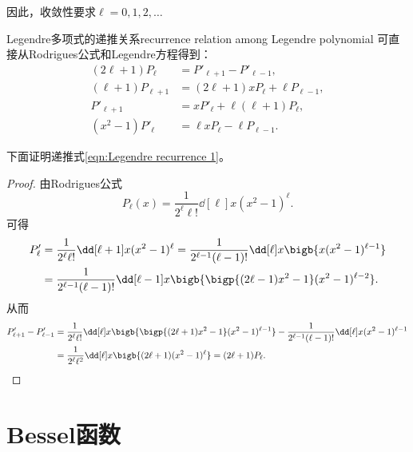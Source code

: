 因此，收敛性要求$\ell=0,1,2,\ldots$
\begin{theorem}{Legendre多项式的递推关系}{recurrence relation among Legendre polynomial}
    可直接从Rodrigues公式和Legendre方程得到：
    \begin{subequations}
        \begin{align}
            \label{eqn:Legendre recurrence 1}
            (2\ell+1)P_\ell&=P'_{\ell+1}-P'_{\ell-1},\\
            (\ell+1)P_{\ell+1}&=(2\ell+1)xP_\ell+\ell P_{\ell-1},\\
            P'_{\ell+1}&=xP'_\ell+\ell(\ell+1)P_\ell,\\
            (x^2-1)P'_\ell&=\ell xP_\ell-\ell P_{\ell-1}.
        \end{align}
    \end{subequations}
\end{theorem}
下面证明递推式\eqref{eqn:Legendre recurrence 1}。
\begin{proof}
    由Rodrigues公式
    \begin{equation}
        P_\ell(x)=\frac1{2^\ell\ell!}\dd[\ell]x(x^2-1)^\ell.
    \end{equation}
    可得
    \begin{align*}
        P'_\ell&=\frac1{2^\ell\ell!}\dd[\ell+1]x(x^2-1)^\ell=\frac1{2^{\ell-1}(\ell-1)!}\dd[\ell]x\bigb{x(x^2-1)^{\ell-1}}\\
        &=\frac1{2^{\ell-1}(\ell-1)!}\dd[\ell-1]x\bigb{\bigp{(2\ell-1)x^2-1}(x^2-1)^{\ell-2}}.
    \end{align*}
    从而 
    \begin{align*}
        P_{\ell+1}'-P_{\ell-1}'&=\frac1{2^\ell\ell!}\dd[\ell]x\bigb{\bigp{(2\ell+1)x^2-1}(x^2-1)^{\ell-1}}-\frac1{2^{\ell-1}(\ell-1)!}\dd[\ell]x(x^2-1)^{\ell-1}\\
        &=\frac1{2^\ell\ell^2}\dd[\ell]x\bigb{(2\ell+1)(x^2-1)^\ell}=(2\ell+1)P_\ell.\qedhere
    \end{align*}
\end{proof}


\section{Bessel函数}
\label{sec:Bessel function}

